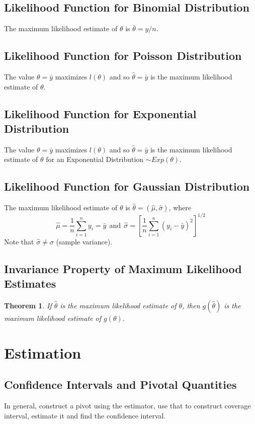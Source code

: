 \documentclass[12pt, leqno]{article}
\theoremstyle{definition}
\newtheorem*{theorem}{Theorem}
\begin{document}
  \subsection{Likelihood Function for Binomial Distribution}
  The maximum likelihood estimate of $\theta$ is $\bar{\theta} = y / n$.

  \subsection{Likelihood Function for Poisson Distribution}
  The value $\theta = \bar{y}$ maximizes $l(\theta)$ and so $\hat{\theta} = \bar{y}$ is the maximum likelihood estimate of $\theta$.

  \subsection{Likelihood Function for Exponential Distribution}
  The value $\theta = \bar{y}$ maximizes $l(\theta)$ and so $\hat{\theta} = \bar{y}$ is the maximum likelihood estimate of $\theta$ for an Exponential Distribution $\sim Exp(\theta)$.

  \subsection{Likelihood Function for Gaussian Distribution}
  The maximum likelihood estimate of $\theta$ is $\hat{\theta} = (\hat{\mu}, \hat{\sigma})$, where
  $$
  \hat{\mu} = \frac{1}{n}\sum_{i=1}^{n}y_{i} = \bar{y}
  ~~\text{and}~~
  \hat{\sigma} = \left[\frac{1}{n}\sum_{i=1}^{n}(y_{i} - \bar{y})^{2}\right]^{1/2}
  $$
  Note that $\hat{\sigma} \not = \sigma$ (sample variance).

  \subsection{Invariance Property of Maximum Likelihood Estimates}
  \begin{theorem}
    \emph{If $\hat{\theta}$ is the maximum likelihood estimate of $\theta$, then $g(\hat{\theta})$ is the maximum likelihood estimate of $g(\theta)$.}
  \end{theorem}

  \section{Estimation}
  \subsection{Confidence Intervals and Pivotal Quantities}
  In general, construct a pivot using the estimator, use that to construct coverage interval, estimate it and find the confidence interval.
\end{document}
